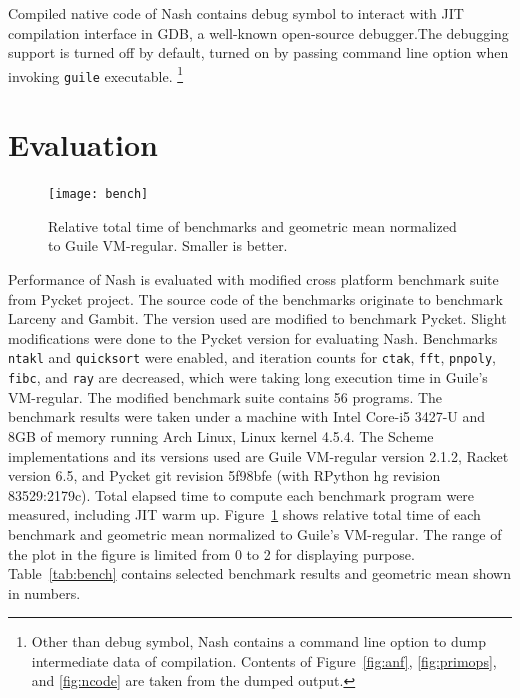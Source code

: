 \documentclass[preprint]{sigplanconf}
\begin{document}
Compiled native code of Nash contains debug symbol to interact with JIT
compilation interface in GDB, a well-known open-source debugger.\@ The debugging
support is turned off by default, turned on by passing command line option when
invoking \texttt{guile} executable.
\footnote{Other than debug symbol, Nash contains a command line option to dump
  intermediate data of compilation. Contents of
  Figure~\hyperref[fig:anf]{\ref{fig:anf}},
  \hyperref[fig:primops]{\ref{fig:primops}}, and
  \hyperref[fig:ncode]{\ref{fig:ncode}} are taken from the dumped output.}

\section{Evaluation}
\label{sec:evaluation}

\begin{figure}
  \centering
  \texttt{[image: bench]}
  \caption{Relative total time of benchmarks and geometric mean normalized to
    Guile VM-regular. Smaller is better.}
\label{fig:bench}
\end{figure}


Performance of Nash is evaluated with modified cross platform benchmark suite
from Pycket project. The source code of the benchmarks originate to benchmark
Larceny and Gambit. The version used are modified to benchmark Pycket. Slight
modifications were done to the Pycket version for evaluating Nash. Benchmarks
\texttt{ntakl} and \texttt{quicksort} were enabled, and iteration counts for
\texttt{ctak}, \texttt{fft}, \texttt{pnpoly}, \texttt{fibc}, and \texttt{ray}
are decreased, which were taking long execution time in Guile's VM-regular. The
modified benchmark suite contains 56 programs. The benchmark results were taken
under a machine with Intel Core-i5 3427-U and 8GB of memory running Arch Linux,
Linux kernel 4.5.4. The Scheme implementations and its versions used are Guile
VM-regular version 2.1.2, Racket version 6.5, and Pycket git revision 5f98bfe
(with RPython hg revision 83529:2179c). Total elapsed time to compute each
benchmark program were measured, including JIT warm up. Figure~\ref{fig:bench}
shows relative total time of each benchmark and geometric mean normalized to
Guile's VM-regular. The range of the plot in the figure is limited from 0 to 2
for displaying purpose. Table~\hyperref[tab:bench]{\ref{tab:bench}} contains
selected benchmark results and geometric mean shown in numbers.
\end{document}
